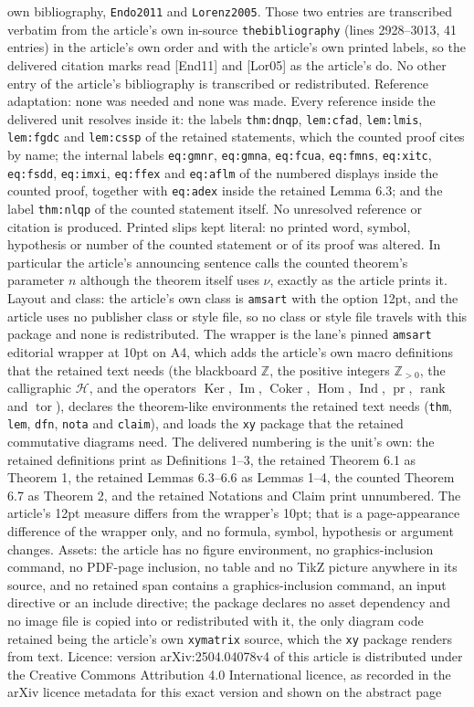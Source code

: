 \documentclass[10pt,a4paper]{amsart}
\newcommand{\Z}{\mathbb{Z}}
\newcommand{\Zpn}{\mathbb{Z}_{>0}}
\newcommand{\cH}{\mathcal{H}}
\DeclareMathOperator{\Ker}{Ker}
\DeclareMathOperator{\Ima}{Im}
\DeclareMathOperator{\Coker}{Coker}
\DeclareMathOperator{\Hom}{Hom}
\DeclareMathOperator{\Ind}{Ind}
\DeclareMathOperator{\pr}{pr}
\DeclareMathOperator{\rk}{rank}
\DeclareMathOperator{\tor}{tor}
\begin{document}
own bibliography, \texttt{Endo2011} and \texttt{Lorenz2005}. Those two entries are transcribed verbatim from the article's own in-source \texttt{thebibliography} (lines 2928--3013, 41 entries) in the article's own order and with the article's own printed labels, so the delivered citation marks read [End11] and [Lor05] as the article's do. No other entry of the article's bibliography is transcribed or redistributed. Reference adaptation: none was needed and none was made. Every reference inside the delivered unit resolves inside it: the labels \texttt{thm:dnqp}, \texttt{lem:cfad}, \texttt{lem:lmis}, \texttt{lem:fgdc} and \texttt{lem:cssp} of the retained statements, which the counted proof cites by name; the internal labels \texttt{eq:gmnr}, \texttt{eq:gmna}, \texttt{eq:fcua}, \texttt{eq:fmns}, \texttt{eq:xitc}, \texttt{eq:fsdd}, \texttt{eq:imxi}, \texttt{eq:ffex} and \texttt{eq:aflm} of the numbered displays inside the counted proof, together with \texttt{eq:adex} inside the retained Lemma 6.3; and the label \texttt{thm:nlqp} of the counted statement itself. No unresolved reference or citation is produced. Printed slips kept literal: no printed word, symbol, hypothesis or number of the counted statement or of its proof was altered. In particular the article's announcing sentence calls the counted theorem's parameter $n$ although the theorem itself uses $\nu$, exactly as the article prints it. Layout and class: the article's own class is \texttt{amsart} with the option 12pt, and the article uses no publisher class or style file, so no class or style file travels with this package and none is redistributed. The wrapper is the lane's pinned \texttt{amsart} editorial wrapper at 10pt on A4, which adds the article's own macro definitions that the retained text needs (the blackboard $\Z$, the positive integers $\Zpn$, the calligraphic $\cH$, and the operators $\Ker$, $\Ima$, $\Coker$, $\Hom$, $\Ind$, $\pr$, $\rk$ and $\tor$), declares the theorem-like environments the retained text needs (\texttt{thm}, \texttt{lem}, \texttt{dfn}, \texttt{nota} and \texttt{claim}), and loads the \texttt{xy} package that the retained commutative diagrams need. The delivered numbering is the unit's own: the retained definitions print as Definitions 1--3, the retained Theorem 6.1 as Theorem 1, the retained Lemmas 6.3--6.6 as Lemmas 1--4, the counted Theorem 6.7 as Theorem 2, and the retained Notations and Claim print unnumbered. The article's 12pt measure differs from the wrapper's 10pt; that is a page-appearance difference of the wrapper only, and no formula, symbol, hypothesis or argument changes. Assets: the article has no figure environment, no graphics-inclusion command, no PDF-page inclusion, no table and no TikZ picture anywhere in its source, and no retained span contains a graphics-inclusion command, an input directive or an include directive; the package declares no asset dependency and no image file is copied into or redistributed with it, the only diagram code retained being the article's own \texttt{xymatrix} source, which the \texttt{xy} package renders from text. Licence: version arXiv:2504.04078v4 of this article is distributed under the Creative Commons Attribution 4.0 International licence, as recorded in the arXiv licence metadata for this exact version and shown on the abstract page 
\end{document}
